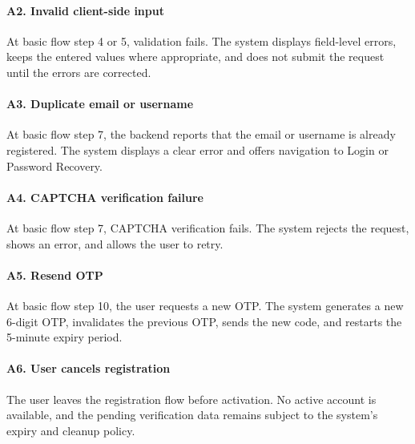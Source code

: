 \documentclass[12pt]{article}
\begin{document}
\paragraph*{A2. Invalid client-side input}
\par\medskip
At basic flow step 4 or 5, validation fails. The system displays field-level errors, keeps the entered values where appropriate, and does not submit the request until the errors are corrected.
\par\medskip
\hypertarget{sec:a3-duplicate-email-or-username}{}
\paragraph*{A3. Duplicate email or username}
\par\medskip
At basic flow step 7, the backend reports that the email or username is already registered. The system displays a clear error and offers navigation to Login or Password Recovery.
\par\medskip
\hypertarget{sec:a4-captcha-verification-failure}{}
\paragraph*{A4. CAPTCHA verification failure}
\par\medskip
At basic flow step 7, CAPTCHA verification fails. The system rejects the request, shows an error, and allows the user to retry.
\par\medskip
\hypertarget{sec:a5-resend-otp}{}
\paragraph*{A5. Resend OTP}
\par\medskip
At basic flow step 10, the user requests a new OTP. The system generates a new 6-digit OTP, invalidates the previous OTP, sends the new code, and restarts the 5-minute expiry period.
\par\medskip
\hypertarget{sec:a6-user-cancels-registration}{}
\paragraph*{A6. User cancels registration}
\par\medskip
The user leaves the registration flow before activation. No active account is available, and the pending verification data remains subject to the system's expiry and cleanup policy.
\par\medskip
\hypertarget{sec:e1-otp-invalid-expired-or-already-used}{}
\end{document}

